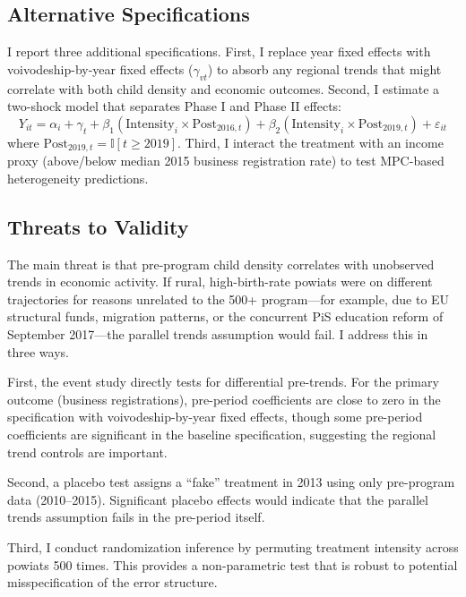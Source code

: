 \documentclass[12pt]{article}
\newcommand{\ind}{\mathbb{I}}
\begin{document}
\subsection{Alternative Specifications}

I report three additional specifications. First, I replace year fixed effects with voivodeship-by-year fixed effects ($\gamma_{vt}$) to absorb any regional trends that might correlate with both child density and economic outcomes. Second, I estimate a two-shock model that separates Phase I and Phase II effects:
\begin{equation}
Y_{it} = \alpha_i + \gamma_t + \beta_1 (\text{Intensity}_i \times \text{Post}_{2016,t}) + \beta_2 (\text{Intensity}_i \times \text{Post}_{2019,t}) + \varepsilon_{it}
\end{equation}
where $\text{Post}_{2019,t} = \ind[t \geq 2019]$. Third, I interact the treatment with an income proxy (above/below median 2015 business registration rate) to test MPC-based heterogeneity predictions.

\subsection{Threats to Validity}

The main threat is that pre-program child density correlates with unobserved trends in economic activity. If rural, high-birth-rate powiats were on different trajectories for reasons unrelated to the 500+ program---for example, due to EU structural funds, migration patterns, or the concurrent PiS education reform of September 2017---the parallel trends assumption would fail. I address this in three ways.

First, the event study directly tests for differential pre-trends. For the primary outcome (business registrations), pre-period coefficients are close to zero in the specification with voivodeship-by-year fixed effects, though some pre-period coefficients are significant in the baseline specification, suggesting the regional trend controls are important.

Second, a placebo test assigns a ``fake'' treatment in 2013 using only pre-program data (2010--2015). Significant placebo effects would indicate that the parallel trends assumption fails in the pre-period itself.

Third, I conduct randomization inference by permuting treatment intensity across powiats 500 times. This provides a non-parametric test that is robust to potential misspecification of the error structure.
\end{document}
